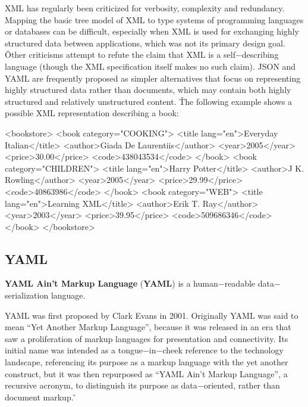 XML has regularly been criticized for verbosity, complexity and redundancy. Mapping the basic tree model of XML to
type systems of programming languages or databases can be difficult, especially when XML is used for exchanging
highly structured data between applications, which was not its primary design goal. \v

Other criticisms attempt to refute the claim that XML is a self$-$describing language (though the XML specification
itself makes no such claim). JSON and YAML are frequently proposed as simpler alternatives that focus on representing
highly structured data rather than documents, which may contain both highly structured and relatively unstructured
content. \v

The following example shows a possible XML representation describing a book:

\begin{block}
<bookstore>
  <book category="COOKING">
    <title lang="en">Everyday Italian</title>
    <author>Giada De Laurentiis</author>
    <year>2005</year>
    <price>30.00</price>
    <code>438043534</code>
  </book>
  <book category="CHILDREN">
    <title lang="en">Harry Potter</title>
    <author>J K. Rowling</author>
    <year>2005</year>
    <price>29.99</price>
    <code>40863986</code>
  </book>
  <book category="WEB">
    <title lang="en">Learning XML</title>
    <author>Erik T. Ray</author>
    <year>2003</year>
    <price>39.95</price>
    <code>509686346</code>
  </book>
</bookstore>
\end{block}

\subsection{YAML}


\textbf{YAML Ain't Markup Language} (\textbf{YAML}) is a human$-$readable data$-$serialization language.
\ed

YAML was first proposed by Clark Evans in 2001. Originally YAML was said to mean ``Yet Another Markup Language'',
because it was released in an era that saw a proliferation of markup languages for presentation and connectivity. Its
initial name was intended as a tongue$-$in$-$cheek reference to the technology landscape, referencing its purpose as
a markup language with the yet another construct, but it was then repurposed as ``YAML Ain't Markup Language'', a
recursive acronym, to distinguish its purpose as data$-$oriented, rather than document markup. \v

